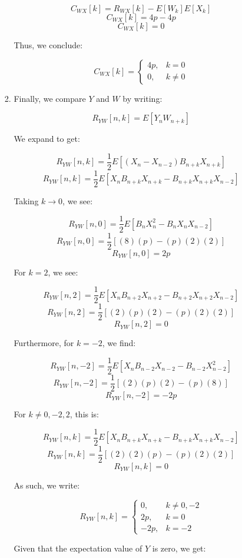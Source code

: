 \begin{enumerate}
\begin{enumerate}
\begin{enumerate}
            $$C_{WX}[k]=R_{WX}[k]-E[W_k]E[X_k]$$
            $$C_{WX}[k]=4p-4p$$
            $$C_{WX}[k]=0$$

            Thus, we conclude:

            $$\boxed{C_{WX}[k]=\left\{\begin{array}{ll} 4p, & k=0\\ 0, & k\neq0\end{array}}$$

          \item Finally, we compare $Y$ and $W$ by writing:

            $$R_{YW}[n,k]=E[Y_nW_{n+k}]$$

            We expand to get:

            $$R_{YW}[n,k]=\frac{1}{2}E[(X_n-X_{n-2})B_{n+k}X_{n+k}]$$
            $$R_{YW}[n,k]=\frac{1}{2}E[X_nB_{n+k}X_{n+k}-B_{n+k}X_{n+k}X_{n-2}]$$

            Taking $k\to0$, we see:

            $$R_{YW}[n,0]=\frac{1}{2}E[B_{n}X_{n}^2-B_{n}X_{n}X_{n-2}]$$
            $$R_{YW}[n,0]=\frac{1}{2}[(8)(p)-(p)(2)(2)]$$
            $$R_{YW}[n,0]=2p$$

            For $k=2$, we see:

            $$R_{YW}[n,2]=\frac{1}{2}E[X_nB_{n+2}X_{n+2}-B_{n+2}X_{n+2}X_{n-2}]$$
            $$R_{YW}[n,2]=\frac{1}{2}[(2)(p)(2)-(p)(2)(2)]$$
            $$R_{YW}[n,2]=0$$

            Furthermore, for $k=-2$, we find:

            $$R_{YW}[n,-2]=\frac{1}{2}E[X_nB_{n-2}X_{n-2}-B_{n-2}X_{n-2}^2]$$
            $$R_{YW}[n,-2]=\frac{1}{2}[(2)(p)(2)-(p)(8)]$$
            $$R_{YW}[n,-2]=-2p$$

            For $k\neq0,-2,2$, this is:

            $$R_{YW}[n,k]=\frac{1}{2}E[X_nB_{n+k}X_{n+k}-B_{n+k}X_{n+k}X_{n-2}]$$
            $$R_{YW}[n,k]=\frac{1}{2}[(2)(2)(p)-(p)(2)(2)]$$
            $$R_{YW}[n,k]=0$$

            As such, we write:

            $$\boxed{R_{YW}[n,k]=\left\{\begin{array}{ll} 0, & k\neq0,-2\\ 2p, & k=0\\-2p, & k=-2\end{array}}$$

            Given that the expectation value of $Y$ is zero, we get:


\end{enumerate}
\end{enumerate}
\end{enumerate}
